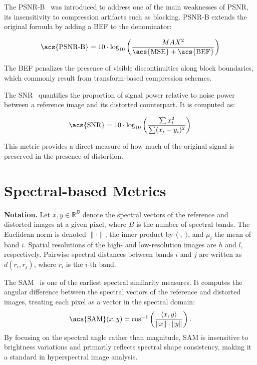 The \acf{PSNR-B}~\cite{ma2011psnrb, yim2011psnrb} was introduced to address one of the main weaknesses of \acs{PSNR}, its insensitivity to compression artifacts such as blocking. \acs{PSNR-B} extends the original formula by adding a \acf{BEF} to the denominator:

\begin{equation}
\text{\acs{PSNR-B}} = 10 \cdot \log_{10} \left( \frac{MAX^2}{\text{\acs{MSE}} + \text{\acs{BEF}}} \right)
\end{equation}

The \acs{BEF} penalizes the presence of visible discontinuities along block boundaries, which commonly result from transform-based compression schemes.

The \acf{SNR}~\cite{wang2004image} quantifies the proportion of signal power relative to noise power between a reference image and its distorted counterpart. It is computed as:

\begin{equation}
\text{\acs{SNR}} = 10 \cdot \log_{10} \left( \frac{\sum x_i^2}{\sum (x_i - y_i)^2} \right)
\end{equation}

This metric provides a direct measure of how much of the original signal is preserved in the presence of distortion.

\section{Spectral-based Metrics}\label{app:sec:spectral_based_metrics}

\noindent\textbf{Notation.}  
Let $x, y \in \mathbb{R}^B$ denote the spectral vectors of the reference and distorted images at a given pixel, where $B$ is the number of spectral bands. The Euclidean norm is denoted $\|\cdot\|$, the inner product by $\langle \cdot, \cdot \rangle$, and $\mu_i$ the mean of band $i$. Spatial resolutions of the high- and low-resolution images are $h$ and $l$, respectively. Pairwise spectral distances between bands $i$ and $j$ are written as $d(r_i, r_j)$, where $r_i$ is the $i$-th band.  

The \acf{SAM}~\cite{yuhas1992sam} is one of the earliest spectral similarity measures. 
It computes the angular difference between the spectral vectors of the reference and distorted images, 
treating each pixel as a vector in the spectral domain:
\begin{equation}
\text{\acs{SAM}}(x,y) = \cos^{-1} \left( \frac{ \langle x, y \rangle }{ \|x\| \cdot \|y\| } \right).
\end{equation}
By focusing on the spectral angle rather than magnitude, \acs{SAM} is insensitive to brightness variations 
and primarily reflects spectral shape consistency, making it a standard in hyperspectral image analysis.

